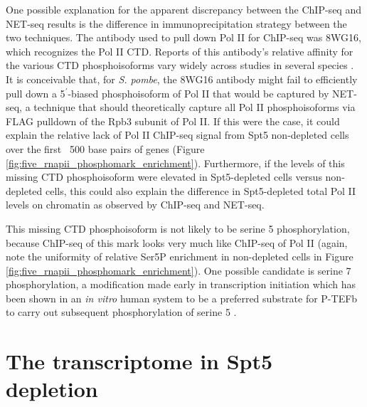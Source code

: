 One possible explanation for the apparent discrepancy between the ChIP-seq and NET-seq results is the difference in immunoprecipitation strategy between the two techniques.
The antibody used to pull down Pol II for ChIP-seq was 8WG16, which recognizes the Pol II CTD.
Reports of this antibody's relative affinity for the various CTD phosphoisoforms vary widely across studies in several species \citep{zeitlinger2007}.
It is conceivable that, for \textit{S. pombe}, the 8WG16 antibody might fail to efficiently pull down a 5$^\prime$-biased phosphoisoform of Pol II that would be captured by NET-seq, a technique that should theoretically capture all Pol II phosphoisoforms via FLAG pulldown of the Rpb3 subunit of Pol II.
If this were the case, it could explain the relative lack of Pol II ChIP-seq signal from Spt5 non-depleted cells over the first ~500 base pairs of genes (Figure \ref{fig:five_rnapii_phosphomark_enrichment}).
Furthermore, if the levels of this missing CTD phosphoisoform were elevated in Spt5-depleted cells versus non-depleted cells, this could also explain the difference in Spt5-depleted total Pol II levels on chromatin as observed by ChIP-seq and NET-seq.

This missing CTD phosphoisoform is not likely to be serine 5 phosphorylation, because ChIP-seq of this mark looks very much like ChIP-seq of Pol II (again, note the uniformity of relative Ser5P enrichment in non-depleted cells in Figure \ref{fig:five_rnapii_phosphomark_enrichment}).
One possible candidate is serine 7 phosphorylation, a modification made early in transcription initiation which has been shown in an \textit{in vitro} human system to be a preferred substrate for P-TEFb to carry out subsequent phosphorylation of serine 5 \citep{czudnochowski2012}.

\section{The transcriptome in Spt5 depletion}
\label{sec:five_transcriptome}

